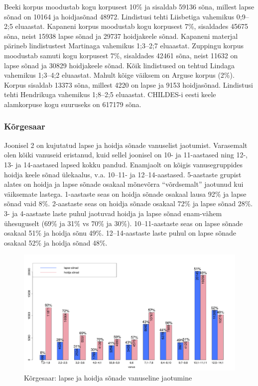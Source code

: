 \documentclass[12pt]{article}
\begin{document}
Beeki korpus moodustab kogu korpusest 10\% ja sisaldab 59136 sõna, millest lapse sõnad on 10164 ja hoidjasõnad 48972. Lindistusi tehti Liisbetiga vahemikus 0;9--2;5 eluaastat. Kapaneni korpus moodustab kogu korpusest 7\%, sisaldades 45675 sõna, neist 15938 lapse sõnad ja 29737 hoidjakeele sõnad. Kapaneni materjal pärineb lindistustest Martinaga vahemikus 1;3--2;7 eluaastat. Zuppingu korpus moodustab samuti kogu korpusest 7\%, sisaldades 42461 sõna, neist 11632 on lapse sõnad ja 30829 hoidjakeele sõnad. Kõik lindistused on tehtud Lindaga vahemikus 1;3--4;2 eluaastat. Mahult kõige väiksem on Arguse korpus (2\%). Korpus sisaldab 13373 sõna, millest 4220 on lapse ja 9153 hoidjasõnad. Lindistusi tehti Hendrikuga vahemikus 1;8--2;5 eluaastat. CHILDES-i eesti keele alamkorpuse kogu suuruseks on 617179 sõna.


\subsubsection{Kõrgesaar}

Joonisel 2 on kujutatud lapse ja hoidja sõnade vanuselist jaotumist. Varasemalt olen kõiki vanuseid eristanud, kuid sellel joonisel on 10- ja 11-aastased ning 12-, 13- ja 14-aastased lapsed kokku pandud. Enamjaolt on kõigis vanusegruppides hoidja keele sõnad ülekaalus, v.a. 10--11- ja 12--14-aastased. 5-aastaste grupist alates on hoidja ja lapse sõnade osakaal mõnevõrra ``võrdsemalt'' jaotunud kui väiksemate lastega. 1-aastaste seas on hoidja sõnade osakaal lausa 92\% 
ja lapse sõnad vaid 8\%. 2-aastaste seas on hoidja sõnade osakaal 72\% ja lapse sõnad 28\%. 3- ja 4-aastaste laste puhul jaotuvad hoidja ja lapse sõnad enam-vähem ühesuguselt (69\% ja 31\% vs 70\% ja 30\%). 10--11-aastaste seas on lapse sõnade osakaal 51\% ja hoidja sõnu 49\%. 12--14-aastaste laste puhul on lapse sõnade osakaal 52\% ja hoidja sõnad 48\%.

\begin{figure}[H]
    \centering
    \includegraphics[width=\textwidth]{korgesaar_vanus_sonad}
    \caption{Kõrgesaar: lapse ja hoidja sõnade vanuseline jaotumine}
\end{figure}
\end{document}
